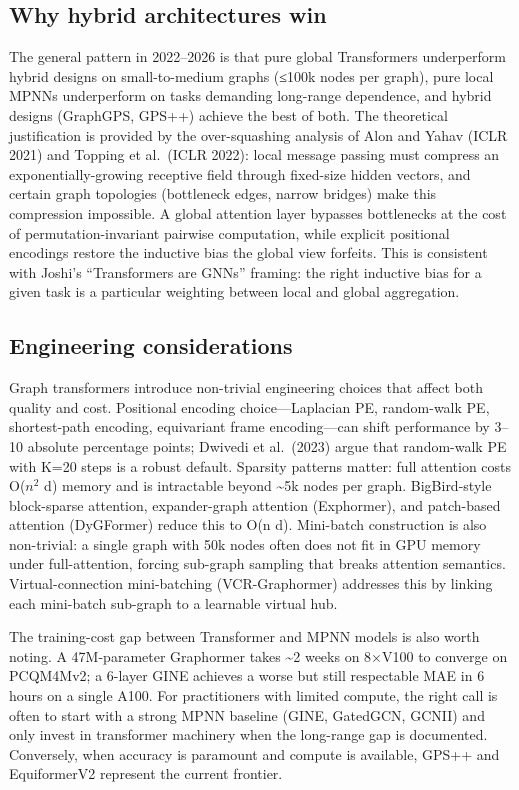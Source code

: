 \documentclass{article}
\begin{document}
\subsection{Why hybrid architectures win}\label{why-hybrid-architectures-win}

The general pattern in 2022--2026 is that pure global Transformers underperform hybrid designs on small-to-medium graphs (≤100k nodes per graph), pure local MPNNs underperform on tasks demanding long-range dependence, and hybrid designs (GraphGPS, GPS++) achieve the best of both. The theoretical justification is provided by the over-squashing analysis of Alon and Yahav (ICLR 2021) and Topping et al.~(ICLR 2022): local message passing must compress an exponentially-growing receptive field through fixed-size hidden vectors, and certain graph topologies (bottleneck edges, narrow bridges) make this compression impossible. A global attention layer bypasses bottlenecks at the cost of permutation-invariant pairwise computation, while explicit positional encodings restore the inductive bias the global view forfeits. This is consistent with Joshi's ``Transformers are GNNs'' framing: the right inductive bias for a given task is a particular weighting between local and global aggregation.

\subsection{Engineering considerations}\label{engineering-considerations}

Graph transformers introduce non-trivial engineering choices that affect both quality and cost. Positional encoding choice---Laplacian PE, random-walk PE, shortest-path encoding, equivariant frame encoding---can shift performance by 3--10 absolute percentage points; Dwivedi et al.~(2023) argue that random-walk PE with K=20 steps is a robust default. Sparsity patterns matter: full attention costs O(\(n^2\) d) memory and is intractable beyond \textasciitilde5k nodes per graph. BigBird-style block-sparse attention, expander-graph attention (Exphormer), and patch-based attention (DyGFormer) reduce this to O(n d). Mini-batch construction is also non-trivial: a single graph with 50k nodes often does not fit in GPU memory under full-attention, forcing sub-graph sampling that breaks attention semantics. Virtual-connection mini-batching (VCR-Graphormer) addresses this by linking each mini-batch sub-graph to a learnable virtual hub.

The training-cost gap between Transformer and MPNN models is also worth noting. A 47M-parameter Graphormer takes \textasciitilde2 weeks on 8×V100 to converge on PCQM4Mv2; a 6-layer GINE achieves a worse but still respectable MAE in 6 hours on a single A100. For practitioners with limited compute, the right call is often to start with a strong MPNN baseline (GINE, GatedGCN, GCNII) and only invest in transformer machinery when the long-range gap is documented. Conversely, when accuracy is paramount and compute is available, GPS++ and EquiformerV2 represent the current frontier.
\end{document}
